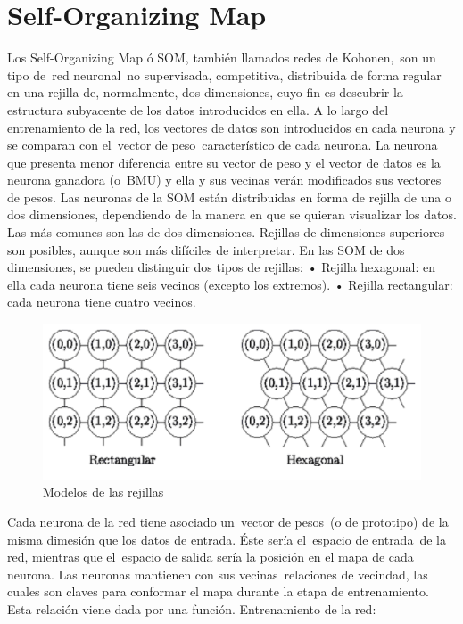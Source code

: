 \documentclass[a4paper,11pt]{article}
\begin{document}
\section{Self-Organizing Map}

      Los Self-Organizing Map ó SOM, también llamados redes de Kohonen, son
un tipo de red neuronal no supervisada, competitiva,  distribuida  de  forma
regular en una  rejilla  de,  normalmente,  dos  dimensiones,  cuyo  fin  es
descubrir la estructura subyacente de los datos introducidos en ella.  A  lo
largo del entrenamiento de la red, los vectores de  datos  son  introducidos
en cada neurona y se comparan con el vector de peso característico  de  cada
neurona. La neurona que presenta menor diferencia entre su vector de peso  y
el vector de datos es la neurona ganadora  (o BMU)  y  ella  y  sus  vecinas
verán modificados sus vectores de pesos.
      Las neuronas de la SOM están distribuidas en forma de rejilla de una o
dos dimensiones, dependiendo de la manera en que se quieran  visualizar  los
datos. Las más comunes son las de dos dimensiones. Rejillas  de  dimensiones
superiores son posibles, aunque son más difíciles de interpretar.
En las SOM de dos dimensiones, se pueden distinguir dos tipos de rejillas:
    • Rejilla hexagonal: en ella cada neurona tiene  seis  vecinos  (excepto
      los extremos).
    • Rejilla rectangular: cada neurona tiene cuatro vecinos.


\begin{figure}[h!]
  \centering
  \includegraphics[scale=0.7]{docs/rejillas.png}
  \caption{Modelos de las rejillas}
\end{figure}

      Cada neurona de  la  red  tiene  asociado  un vector  de  pesos (o  de
prototipo) de la misma dimesión  que  los  datos  de  entrada.  Éste  sería
el espacio de entrada de la red, mientras que el espacio de salida sería  la
posición en el mapa de cada neurona.
      Las neuronas mantienen con sus  vecinas relaciones  de  vecindad,  las
cuales son claves para conformar el mapa durante la etapa de  entrenamiento.
Esta relación viene dada por una función.
Entrenamiento de la red:
\end{document}
